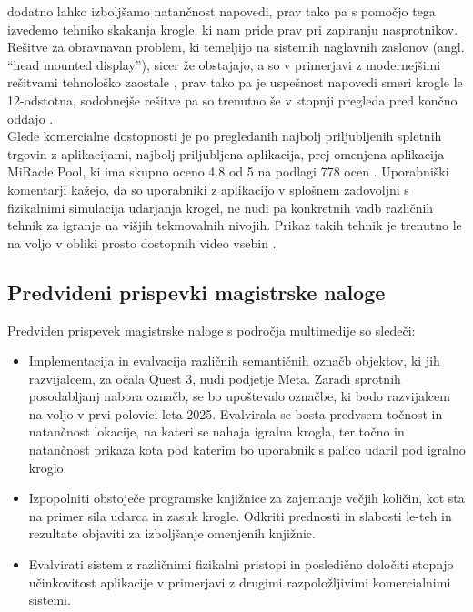 \documentclass[a4paper, 12pt]{article}
\newcommand\cmnt[1]{\textcolor{munsell}{#1}}
\begin{document}
dodatno lahko izboljšamo natančnost napovedi, prav tako pa s pomočjo tega izvedemo tehniko skakanja krogle, ki nam pride prav pri zapiranju nasprotnikov. \\
Rešitve za obravnavan problem, ki temeljijo na sistemih naglavnih zaslonov (angl. ``head mounted display''), sicer že obstajajo, a so v primerjavi z modernejšimi rešitvami tehnološko zaostale \cite{Sargaana2005Collaborative}, prav tako pa je uspešnost napovedi smeri krogle le 12-odstotna, sodobnejše rešitve pa so trenutno še v stopnji pregleda pred končno oddajo \cite{Yan2024Enhancing}. \\ Glede komercialne dostopnosti je po pregledanih najbolj priljubljenih spletnih trgovin z aplikacijami, najbolj priljubljena aplikacija, prej omenjena aplikacija MiRacle Pool, ki ima skupno oceno 4.8 od 5 na podlagi 778 ocen \cite{MiraclePool}. Uporabniški komentarji kažejo, da so uporabniki z aplikacijo v splošnem zadovoljni s fizikalnimi simulacija udarjanja krogel, ne nudi pa konkretnih vadb različnih tehnik za igranje na višjih tekmovalnih nivojih. Prikaz takih tehnik je trenutno le na voljo v obliki prosto dostopnih video vsebin \cite{EDU}.    


\subsection{Predvideni prispevki magistrske naloge}
Predviden prispevek magistrske naloge s področja multimedije so sledeči:
\begin{itemize}
    \item Implementacija in evalvacija različnih semantičnih označb objektov, ki jih razvijalcem, za očala Quest 3, nudi podjetje Meta. Zaradi sprotnih posodabljanj nabora označb, se bo upoštevalo označbe, ki bodo razvijalcem na voljo v prvi polovici leta 2025. Evalvirala se bosta predvsem točnost in natančnost lokacije, na kateri se nahaja igralna krogla, ter točno in natančnost prikaza kota pod katerim bo uporabnik s palico udaril pod igralno kroglo.
    \item Izpopolniti obstoječe programske knjižnice za zajemanje večjih količin, kot sta na primer sila udarca in zasuk krogle. Odkriti prednosti in slabosti le-teh in rezultate objaviti za izboljšanje omenjenih knjižnic.
    \item Evalvirati sistem z različnimi fizikalni pristopi in posledično določiti stopnjo učinkovitost aplikacije v primerjavi z drugimi razpoložljivimi komercialnimi sistemi.
\end{itemize}
\end{document}

